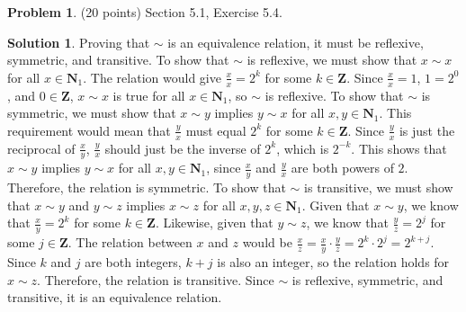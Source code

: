 \documentclass{article}
\theoremstyle{definition}
\newtheorem{problem}{Problem}
\newtheorem*{solution}{Solution}
\newcommand{\N}{\mathbf{N}}
\newcommand{\Z}{\mathbf{Z}}
\begin{document}
\newpage
\begin{problem} (20 points) Section 5.1, Exercise 5.4.
\end{problem}
\begin{solution} 
Proving that $\sim$ is an equivalence relation, it must be reflexive, symmetric, and transitive.
To show that $\sim$ is reflexive, we must show that $x \sim x$ for all $x \in \N_1$.
The relation would give $\frac{x}{x} = 2^{k}$ for some $k \in \Z$.
Since $\frac{x}{x} = 1$, $1 = 2^{0}$, and $0 \in \Z$, $x \sim x$ is true for all $x \in \N_1$, so $\sim$ is reflexive.
To show that $\sim$ is symmetric, we must show that $x \sim y$ implies $y \sim x$ for all $x, y \in \N_1$.
This requirement would mean that $\frac{y}{x}$ must equal $2^{k}$ for some $k \in \Z$.
Since $\frac{y}{x}$ is just the reciprocal of $\frac{x}{y}$, $\frac{y}{x}$ should just be the inverse of $2^{k}$, which is $2^{-k}$.
This shows that $x \sim y$ implies $y \sim x$ for all $x, y \in \N_1$, since $\frac{x}{y}$ and $\frac{y}{x}$ are both powers of $2$.
Therefore, the relation is symmetric.
To show that $\sim$ is transitive, we must show that $x \sim y$ and $y \sim z$ implies $x \sim z$ for all $x, y, z \in \N_1$.
Given that $x \sim y$, we know that $\frac{x}{y} = 2^{k}$ for some $k \in \Z$.
Likewise, given that $y \sim z$, we know that $\frac{y}{z} = 2^{j}$ for some $j \in \Z$.
The relation between $x$ and $z$ would be $\frac{x}{z} = \frac{x}{y} \cdot \frac{y}{z} = 2^{k} \cdot 2^{j} = 2^{k+j}$.
Since $k$ and $j$ are both integers, $k+j$ is also an integer, so the relation holds for $x \sim z$.
Therefore, the relation is transitive.
Since $\sim$ is reflexive, symmetric, and transitive, it is an equivalence relation.
\end{solution}
\end{document}

